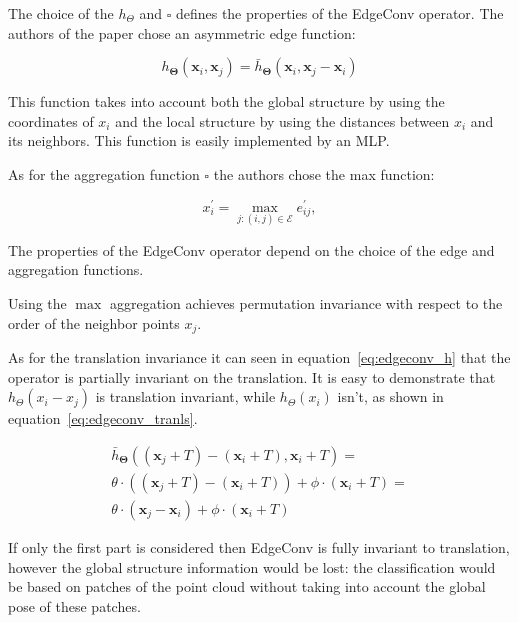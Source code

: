 The choice of the $h_{\Theta}$ and $\square$ defines the properties of the EdgeConv operator. The authors of the paper chose an asymmetric edge function:

\begin{equation}\label{eq:edgeconv_h}
h_{\mathbf{\Theta}}\left(\mathbf{x}_{i}, \mathbf{x}_{j}\right)=\bar{h}_{\mathbf{\Theta}}\left(\mathbf{x}_{i}, \mathbf{x}_{j}-\mathbf{x}_{i}\right)
\end{equation}

This function takes into account both the global structure by using the coordinates of $x_i$ and the local structure by using the distances between $x_i$ and its neighbors. This function is easily implemented by an MLP.

As for the aggregation function $\square$ the authors chose the max function:

$$
x_{i}^{\prime}=\max _{j:(i, j) \in \mathcal{E}} e_{i j}^{\prime},
$$

The properties of the EdgeConv operator depend on the choice of the edge and aggregation functions.

Using the $\max$ aggregation achieves permutation invariance with respect to the order of the neighbor points $x_j$.

As for the translation invariance it can seen in equation~\ref{eq:edgeconv_h} that the operator is partially invariant on the translation. It is easy to demonstrate that $h_{\Theta}(x_i - x_j)$ is translation invariant, while $h_{\Theta}(x_i)$ isn't, as shown in equation~\ref{eq:edgeconv_tranls}.

\begin{equation}\label{eq:edgeconv_tranls}
\begin{split}
    \bar{h}_{\mathbf{\Theta}}\left((\mathbf{x}_{j} + T)-(\mathbf{x}_{i} + T), \mathbf{x}_{i} + T \right) = \\
    \theta \cdot ((\mathbf{x}_{j} + T)-(\mathbf{x}_{i} + T)) + \phi \cdot (\mathbf{x}_{i} + T) = \\
    \theta \cdot (\mathbf{x}_{j}-\mathbf{x}_{i}) + \phi \cdot (\mathbf{x}_{i} + T)
\end{split}
\end{equation}


If only the first part is considered then EdgeConv is fully invariant to translation, however the global structure information would be lost: the classification would be based on patches of the point cloud without taking into account the global pose of these patches.

